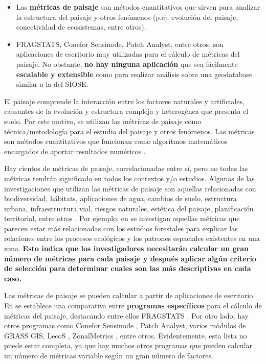 \begin{graybox}
\begin{itemize}
\item Las \textbf{métricas de paisaje} son métodos cuantitativos que sirven para analizar la estructura del paisaje y otros fenómenos (p.ej. evolución del paisaje, conectividad de ecosistemas, entre otros).
\item FRAGSTATS, Conefor Sensinode, Patch Analyst, entre otros, son aplicaciones de escritorio muy utilizadas para el cálculo de métricas del paisaje. No obstante, \textbf{no hay ninguna aplicación} que sea fácilmente \textbf{escalable y extensible} como para realizar análisis sobre una geodatabase similar a la del SIOSE.
\end{itemize}
\end{graybox}

El paisaje comprende la interacción entre los factores naturales y artificiales, causantes de la evolución y estructura compleja y heterogénea que presenta el suelo. Por este motivo, se utilizan las métricas de paisaje como técnica/metodología para el estudio del paisaje y otros fenómenos. Las métricas son métodos cuantitativos que funcionan como algorítmos matemáticos encargados de aportar resultados numéricos \citep{Gine2014}.

Hay cientos de métricas de paisaje, correlacionadas entre sí, pero no todas las métricas tendrán significado en todos los contextos y/o estudios. Algunas de las investigaciones que utilizan las métricas de paisaje son aquellas relacionadas con biodiversidad, hábitats, aplicaciones de agua, cambios de suelo, estructura urbana, infraestructura vial, riesgos naturales, estética del paisaje, planificación territorial, entre otros \citep{Uuemaa2009}. Por ejemplo, en \citet{Uuemaa2017} se investigan aquellas métricas que parecen estar más relacionadas con los estudios forestales para explicar las relaciones entre los procesos ecológicos y los patrones espaciales existentes en una zona. \textbf{Esto indica que los investigadores necesitarán calcular un gran número de métricas para cada paisaje y después aplicar algún criterio de selección para determinar cuales son las más descriptivas en cada caso.}

Las métricas de paisaje se pueden calcular a partir de aplicaciones de escritorio. En \citet{Zaragozi2012} se establece una comparativa entre \textbf{programas específicos} para el cálculo de métricas del paisaje, destacando entre ellos FRAGSTATS \citep{McGarigal1994,McGarigal2015}. Por otro lado, hay otros programas como Conefor Sensinode \citep{Saura2009}, Patch Analyst, varios módulos de GRASS GIS, LecoS \citep{Jung2016}, ZonalMetrics \citep{Adamczyk2017}, entre otros. Evidentemente, esta lista no puede estar completa, ya que hay muchos otros programas que pueden calcular un número de métricas variable según un gran número de factores.

